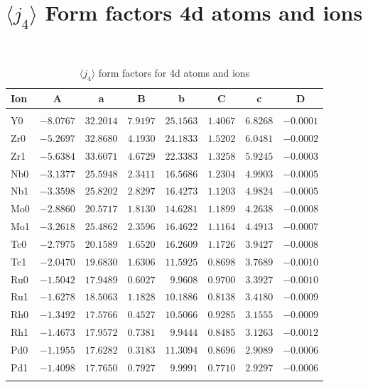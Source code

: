 \section{{\large$\langle j_4\rangle$} Form factors 4d atoms and ions}
\begin{table}[H]
\noindent\caption{$\langle j_4\rangle$ form factors for 4d atoms and ions}\
\label{4dj4}
 \vspace{1ex}
{\tablesize
\begin{tabular}{lrrrrrrr}
\hline
Ion&
\multicolumn{1}{c}{A}&\multicolumn{1}{c}{a}&
\multicolumn{1}{c}{B}&\multicolumn{1}{c}{b}&
\multicolumn{1}{c}{C}&\multicolumn{1}{c}{c}&\multicolumn{1}{c}{D}\\
\hline\\[-2ex]
Y0 &$-8.0767$ &$32.2014$ &$7.9197$ &$25.1563$ &$1.4067$ &$6.8268$ &$-0.0001$ \\
Zr0 &$-5.2697$ &$32.8680$ &$4.1930$ &$24.1833$ &$1.5202$ &$6.0481$ &$-0.0002$ \\
Zr1 &$-5.6384$ &$33.6071$ &$4.6729$ &$22.3383$ &$1.3258$ &$5.9245$ &$-0.0003$ \\
Nb0 &$-3.1377$ &$25.5948$ &$2.3411$ &$16.5686$ &$1.2304$ &$4.9903$ &$-0.0005$ \\
Nb1 &$-3.3598$ &$25.8202$ &$2.8297$ &$16.4273$ &$1.1203$ &$4.9824$ &$-0.0005$ \\
Mo0 &$-2.8860$ &$20.5717$ &$1.8130$ &$14.6281$ &$1.1899$ &$4.2638$ &$-0.0008$ \\
Mo1 &$-3.2618$ &$25.4862$ &$2.3596$ &$16.4622$ &$1.1164$ &$4.4913$ &$-0.0007$ \\
Tc0 &$-2.7975$ &$20.1589$ &$1.6520$ &$16.2609$ &$1.1726$ &$3.9427$ &$-0.0008$ \\
Tc1 &$-2.0470$ &$19.6830$ &$1.6306$ &$11.5925$ &$0.8698$ &$3.7689$ &$-0.0010$ \\
Ru0 &$-1.5042$ &$17.9489$ &$0.6027$ &$9.9608$ &$0.9700$ &$3.3927$ &$-0.0010$ \\
Ru1 &$-1.6278$ &$18.5063$ &$1.1828$ &$10.1886$ &$0.8138$ &$3.4180$ &$-0.0009$ \\
Rh0 &$-1.3492$ &$17.5766$ &$0.4527$ &$10.5066$ &$0.9285$ &$3.1555$ &$-0.0009$ \\
Rh1 &$-1.4673$ &$17.9572$ &$0.7381$ &$9.9444$ &$0.8485$ &$3.1263$ &$-0.0012$ \\
Pd0 &$-1.1955$ &$17.6282$ &$0.3183$ &$11.3094$ &$0.8696$ &$2.9089$ &$-0.0006$ \\
Pd1 &$-1.4098$ &$17.7650$ &$0.7927$ &$9.9991$ &$0.7710$ &$2.9297$ &$-0.0006$ \\
\hline\\[-2ex]
\end{tabular}
}
\end{table}
